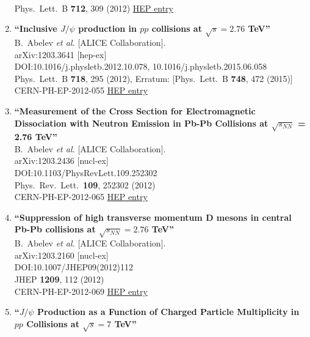 \begin{enumerate}
  \\{}Phys.\ Lett.\ B {\bf 712}, 309 (2012)
\href{http://inspirehep.net/record/1097057}{HEP entry}
\item%
{\bf ``Inclusive $J/\psi$ production in $pp$ collisions at $\sqrt{s} = 2.76$ TeV''}
  \\{}B.~Abelev {\it et al.} [ALICE Collaboration].
  \\{}arXiv:1203.3641 [hep-ex]
  \\{}DOI:10.1016/j.physletb.2012.10.078, 10.1016/j.physletb.2015.06.058
  \\{}Phys.\ Lett.\ B {\bf 718}, 295 (2012), Erratum: [Phys.\ Lett.\ B {\bf 748}, 472 (2015)]
  \\{}CERN-PH-EP-2012-055
\href{http://inspirehep.net/record/1094079}{HEP entry}
\item%
{\bf ``Measurement of the Cross Section for Electromagnetic Dissociation with Neutron Emission in Pb-Pb Collisions at $\sqrt{s_{NN}}$ = 2.76 TeV''}
  \\{}B.~Abelev {\it et al.} [ALICE Collaboration].
  \\{}arXiv:1203.2436 [nucl-ex]
  \\{}DOI:10.1103/PhysRevLett.109.252302
  \\{}Phys.\ Rev.\ Lett.\  {\bf 109}, 252302 (2012)
  \\{}CERN-PH-EP-2012-065
\href{http://inspirehep.net/record/1093519}{HEP entry}
\item%
{\bf ``Suppression of high transverse momentum D mesons in central Pb-Pb collisions at $\sqrt{s_{NN}}=2.76$ TeV''}
  \\{}B.~Abelev {\it et al.} [ALICE Collaboration].
  \\{}arXiv:1203.2160 [nucl-ex]
  \\{}DOI:10.1007/JHEP09(2012)112
  \\{}JHEP {\bf 1209}, 112 (2012)
  \\{}CERN-PH-EP-2012-069
\href{http://inspirehep.net/record/1093488}{HEP entry}
\item%
{\bf ``$J/\psi$ Production as a Function of Charged Particle Multiplicity in $pp$ Collisions at $\sqrt{s} = 7$ TeV''}

\end{enumerate}
